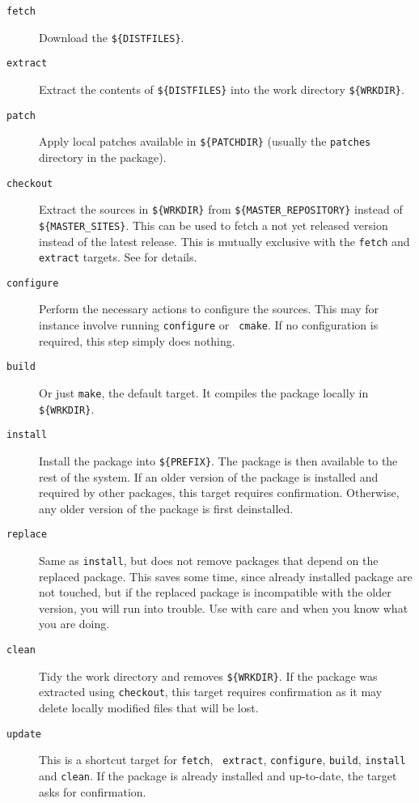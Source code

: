 \begin{description}
   \item[{\tt fetch}] Download the {\tt\$\{DISTFILES\}}.

   \item[{\tt extract}] Extract the contents of {\tt\$\{DISTFILES\}} into the
   work directory {\tt\$\{WRKDIR\}}.

   \item[{\tt patch}] Apply local patches available in {\tt\$\{PATCHDIR\}}
   (usually the {\tt patches} directory in the package).

   \item[{\tt checkout}] Extract the sources in {\tt\$\{WRKDIR\}} from
   {\tt\$\{MASTER\_REPOSITORY\}} instead of {\tt\$\{MASTER\_SITES\}}. This can
   be used to fetch a not yet released version instead of the latest
   release. This is mutually exclusive with the {\tt fetch} and {\tt extract}
   targets. See
    for
   details.

   \item[{\tt configure}] Perform the necessary actions to configure the
   sources. This may for instance involve running {\tt configure} or {\tt
   cmake}. If no configuration is required, this step simply does nothing.

   \item[{\tt build}] Or  just {\tt make}, the default  target. It compiles the
   package locally in {\tt\$\{WRKDIR\}}.

   \item[{\tt install}] Install the package into {\tt\$\{PREFIX\}}. The package
   is then available to the rest of the system. If an older version of the
   package is installed and required by other packages, this target requires
   confirmation. Otherwise, any older version of the package is first
   deinstalled.

   \item[{\tt replace}] Same as {\tt install}, but does not remove packages
   that depend on the replaced package. This saves some time, since already
   installed package are not touched, but if the replaced package is
   incompatible with the older version, you will run into trouble. Use with
   care and when you know what you are doing.

   \item[{\tt clean}] Tidy the work directory and removes {\tt\$\{WRKDIR\}}. If
   the package was extracted using {\tt checkout}, this target requires
   confirmation as it may delete locally modified files that will be lost.

   \item[{\tt update}] This is a shortcut target for {\tt fetch}, {\tt
   extract}, {\tt configure}, {\tt build}, {\tt install} and {\tt clean}. If
   the package is already installed and up-to-date, the target asks for
   confirmation.

\end{description}

